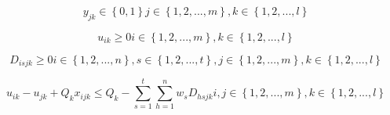 \documentclass[12pt, a4paper, onecolumn, twoside,french,cleardoublepage=plain,openany]{article}
\begin{document}
\begin{equation}
y_{jk} \in\left\{0,1\right\}   j\in\left\{1,2,...,m\right\}, k\in\left\{1,2,...,l\right\}
\end{equation}

\begin{equation}
u_{ik} \geq 0   i\in\left\{1,2,...,m\right\}, k\in\left\{1,2,...,l\right\}
\end{equation}

\begin{equation}
D_{isjk} \geq 0   i\in\left\{1,2,...,n\right\}, s\in\left\{1,2,...,t\right\}, j\in\left\{1,2,...,m\right\}, k\in\left\{1,2,...,l\right\}
\end{equation}



\begin{equation}
u_{ik} - u_{jk} + Q_{k}x_{ijk} \leq Q_{k} - \sum_{s=1}^{t}\sum_{h=1}^{n}w_{s}D_{hsjk}   i,j\in\left\{1,2,...,m\right\}, k\in\left\{1,2,...,l\right\}
\end{equation}
\end{document}
